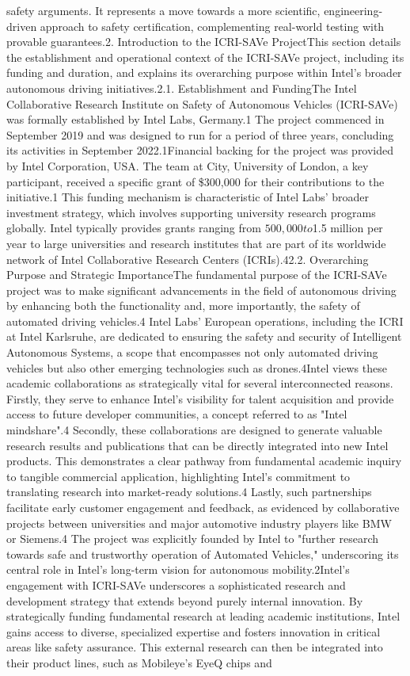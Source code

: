 safety arguments. It represents a move towards a more scientific, engineering-driven approach to safety certification, complementing real-world testing with provable guarantees.2. Introduction to the ICRI-SAVe ProjectThis section details the establishment and operational context of the ICRI-SAVe project, including its funding and duration, and explains its overarching purpose within Intel's broader autonomous driving initiatives.2.1. Establishment and FundingThe Intel Collaborative Research Institute on Safety of Autonomous Vehicles (ICRI-SAVe) was formally established by Intel Labs, Germany.1 The project commenced in September 2019 and was designed to run for a period of three years, concluding its activities in September 2022.1Financial backing for the project was provided by Intel Corporation, USA. The team at City, University of London, a key participant, received a specific grant of \$300,000 for their contributions to the initiative.1 This funding mechanism is characteristic of Intel Labs' broader investment strategy, which involves supporting university research programs globally. Intel typically provides grants ranging from $500,000 to $1.5 million per year to large universities and research institutes that are part of its worldwide network of Intel Collaborative Research Centers (ICRIs).42.2. Overarching Purpose and Strategic ImportanceThe fundamental purpose of the ICRI-SAVe project was to make significant advancements in the field of autonomous driving by enhancing both the functionality and, more importantly, the safety of automated driving vehicles.4 Intel Labs' European operations, including the ICRI at Intel Karlsruhe, are dedicated to ensuring the safety and security of Intelligent Autonomous Systems, a scope that encompasses not only automated driving vehicles but also other emerging technologies such as drones.4Intel views these academic collaborations as strategically vital for several interconnected reasons. Firstly, they serve to enhance Intel's visibility for talent acquisition and provide access to future developer communities, a concept referred to as "Intel mindshare".4 Secondly, these collaborations are designed to generate valuable research results and publications that can be directly integrated into new Intel products. This demonstrates a clear pathway from fundamental academic inquiry to tangible commercial application, highlighting Intel's commitment to translating research into market-ready solutions.4 Lastly, such partnerships facilitate early customer engagement and feedback, as evidenced by collaborative projects between universities and major automotive industry players like BMW or Siemens.4 The project was explicitly founded by Intel to "further research towards safe and trustworthy operation of Automated Vehicles," underscoring its central role in Intel's long-term vision for autonomous mobility.2Intel's engagement with ICRI-SAVe underscores a sophisticated research and development strategy that extends beyond purely internal innovation. By strategically funding fundamental research at leading academic institutions, Intel gains access to diverse, specialized expertise and fosters innovation in critical areas like safety assurance. This external research can then be integrated into their product lines, such as Mobileye's EyeQ chips and 